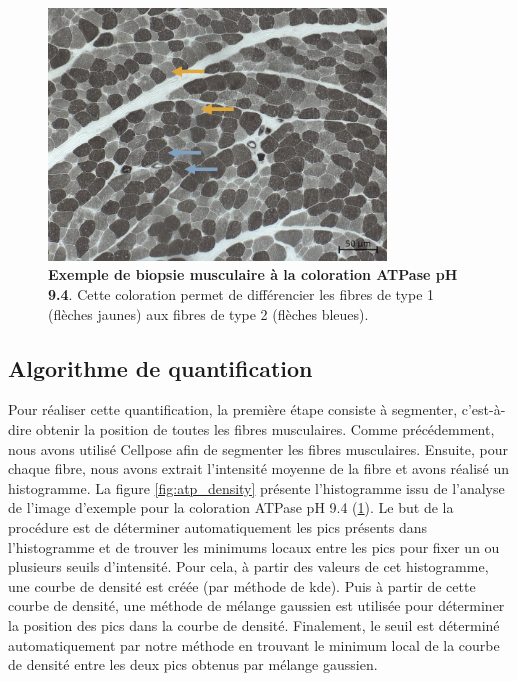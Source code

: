 \begin{figure}[htbp]
 \centering
 \includegraphics[width=0.8\textwidth]{figures/atp_example.png}
 \caption[Exemple de biopsie musculaire à la coloration ATPase pH 9.4]{\textbf{Exemple de biopsie musculaire à la coloration ATPase pH 9.4}. Cette coloration permet de différencier les fibres de type 1 (flèches jaunes) aux fibres de type 2 (flèches bleues).}
 \label{fig:atp_example}
\end{figure}

\subsection{Algorithme de quantification}
Pour réaliser cette quantification, la première étape consiste à segmenter, c'est-à-dire obtenir la position de toutes les fibres musculaires. Comme précédemment, nous avons utilisé Cellpose afin de segmenter les fibres musculaires. Ensuite, pour chaque fibre, nous avons extrait l'intensité moyenne de la fibre et avons réalisé un histogramme. La figure \ref{fig:atp_density} présente l'histogramme issu de l'analyse de l'image d'exemple pour la coloration ATPase pH 9.4 (\ref{fig:atp_example}). Le but de la procédure est de déterminer automatiquement les pics présents dans l'histogramme et de trouver les minimums locaux entre les pics pour fixer un ou plusieurs seuils d'intensité. Pour cela, à partir des valeurs de cet histogramme, une courbe de densité est créée (par méthode de \gls{kde}). Puis à partir de cette courbe de densité, une méthode de mélange gaussien est utilisée pour déterminer la position des pics dans la courbe de densité. Finalement, le seuil est déterminé automatiquement par notre méthode en trouvant le minimum local de la courbe de densité entre les deux pics obtenus par mélange gaussien.


